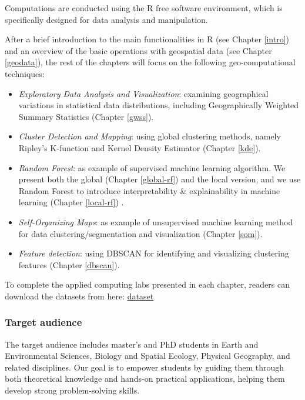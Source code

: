 \documentclass[
]{article}
\providecommand{\tightlist}{%
  \setlength{\itemsep}{0pt}\setlength{\parskip}{0pt}}
\begin{document}
Computations are conducted using the R free software environment, which is specifically designed for data analysis and manipulation.

After a brief introduction to the main functionalities in R (see Chapter \ref{intro}) and an overview of the basic operations with geospatial data (see Chapter \ref{geodata}), the rest of the chapters will focus on the following geo-computational techniques:

\begin{itemize}
\tightlist
\item
  \emph{Exploratory Data Analysis and Visualization}: examining geographical variations in statistical data distributions, including Geographically Weighted Summary Statistics (Chapter \ref{gwss}).
\item
  \emph{Cluster Detection and Mapping}: using global clustering methods, namely Ripley's K-function and Kernel Density Estimator (Chapter \ref{kde}).
\item
  \emph{Random Forest}: as example of supervised machine learning algorithm. We present both the global (Chapter \ref{global-rf}) and the local version, and we use Random Forest to introduce interpretability \& explainability in machine learning (Chapter \ref{local-rf}) .
\item
  \emph{Self-Organizing Maps}: as example of unsupervised machine learning method for data clustering/segmentation and visualization (Chapter \ref{som}).
\item
  \emph{Feature detection}: using DBSCAN for identifying and visualizing clustering features (Chapter \ref{dbscan}).
\end{itemize}

To complete the applied computing labs presented in each chapter, readers can download the datasets from here: \href{data}{dataset}

\subsubsection*{Target audience}\label{target-audience}

The target audience includes master's and PhD students in Earth and Environmental Sciences, Biology and Spatial Ecology, Physical Geography, and related disciplines.
Our goal is to empower students by guiding them through both theoretical knowledge and hands-on practical applications, helping them develop strong problem-solving skills.
\end{document}
